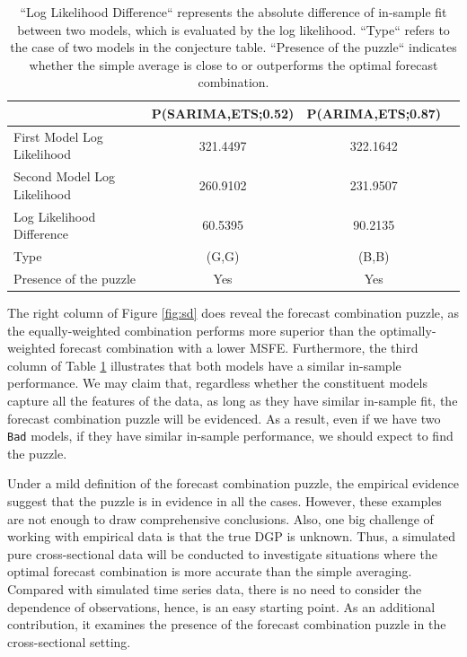 \documentclass{monashthesis}
\begin{document}
\begin{table}[ht]
  \centering
    \begin{tabular}{l|ccc}
    \toprule
                                      &   P(SARIMA,ETS;0.52)   &   P(ARIMA,ETS;0.87)  \\  
    \midrule
    First Model Log Likelihood        &         321.4497       &      322.1642        \\
    Second Model Log Likelihood       &         260.9102       &      231.9507        \\
    Log Likelihood Difference         &         60.5395        &      90.2135         \\
    Type                              &          (G,G)         &       (B,B)          \\
    Presence of the puzzle            &           Yes          &        Yes           \\
    \bottomrule
    \end{tabular}
  \caption{``Log Likelihood Difference`` represents the absolute difference of in-sample fit between two models, which is evaluated by the log likelihood. ``Type`` refers to the case of two models in the conjecture table. ``Presence of the puzzle`` indicates whether the simple average is close to or outperforms the optimal forecast combination.}
  \label{tab:season}
\end{table}

The right column of Figure \ref{fig:sd} does reveal the forecast combination puzzle, as the equally-weighted combination performs more superior than the optimally-weighted forecast combination with a lower MSFE. Furthermore, the third column of Table \ref{tab:season} illustrates that both models have a similar in-sample performance. We may claim that, regardless whether the constituent models capture all the features of the data, as long as they have similar in-sample fit, the forecast combination puzzle will be evidenced. As a result, even if we have two \texttt{Bad} models, if they have similar in-sample performance, we should expect to find the puzzle.

Under a mild definition of the forecast combination puzzle, the empirical evidence suggest that the puzzle is in evidence in all the cases. However, these examples are not enough to draw comprehensive conclusions. Also, one big challenge of working with empirical data is that the true DGP is unknown. Thus, a simulated pure cross-sectional data will be conducted to investigate situations where the optimal forecast combination is more accurate than the simple averaging. Compared with simulated time series data, there is no need to consider the dependence of observations, hence, is an easy starting point. As an additional contribution, it examines the presence of the forecast combination puzzle in the cross-sectional setting.
\end{document}
